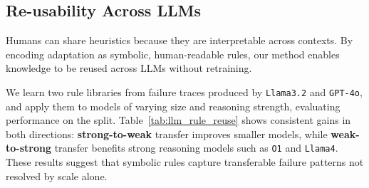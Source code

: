 \subsection{Re-usability Across LLMs}

Humans can share heuristics because they are interpretable across contexts. By encoding
adaptation as symbolic, human-readable rules, our method enables knowledge to be reused
across LLMs without retraining.

We learn two rule libraries from failure traces produced by \texttt{Llama3.2} and
\texttt{GPT-4o}, and apply them to models of varying size and reasoning strength, evaluating
performance on the \rand split. Table~\ref{tab:llm_rule_reuse} shows consistent gains in both
directions: \textbf{strong-to-weak} transfer improves smaller models, while
\textbf{weak-to-strong} transfer benefits strong reasoning models such as \texttt{O1} and
\texttt{Llama4}. These results suggest that symbolic rules capture transferable failure
patterns not resolved by scale alone.


